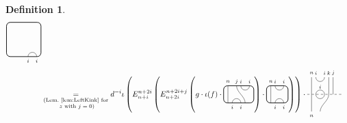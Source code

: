 \documentclass[11pt]{article}
\theoremstyle{plain}
\theoremstyle{definition}
\newtheorem{defn}[thm]{Definition}
\begin{document}
\begin{defn}
\begin{align*}
\begin{tikzpicture}[baseline=.3cm]
\begin{scope}[shift={(0,-.4)}]
    \draw (1,0) arc (180:0:.2cm);
    \node at (1,-.2) {\scriptsize{$i$}};
    \node at (1.4,-.2) {\scriptsize{$i$}};
   \end{scope}
   \draw[thick, rounded corners=5pt] (0,-.4) rectangle (1.6,1.2);
  \end{tikzpicture}
  \\& 
  \underset{
  \substack{
  \text{(Lem.~\ref{lem:LeftKink} for}
  \\
  \text{ 
  $z$ with $j=0$)}
  }
  }
  {=}
  d^{-i}
  \iota\left(E^{n+2i}_{n+i}\left(E^{n+2i+j}_{n+2i}\left(g\cdot\iota(f)\cdot
  \begin{tikzpicture}[baseline=.3cm]
   \draw (.2,0) -- (.2,.8);
   \node at (.2,1) {\scriptsize{$n$}};
   \draw (.6,.8) .. controls ++(-90:.3cm) and ++ (-270:.3cm) .. (1,0);
   \node at (.6,1) {\scriptsize{$j$}};
   \draw (.8,.8) arc (-180:0:.2cm);
   \node at (.8,1) {\scriptsize{$i$}};
   \node at (1.2,1) {\scriptsize{$i$}};
   \draw (.4,0) arc (180:0:.2cm);
   \node at (.4,-.2) {\scriptsize{$i$}};
   \node at (.8,-.2) {\scriptsize{$i$}};
   \draw[thick, rounded corners=5pt] (0,0) rectangle (1.4,.8);
  \end{tikzpicture}
  \right)\cdot
  \begin{tikzpicture}[baseline=.3cm]
   \draw (.2,0) -- (.2,.8);
   \node at (.2,1) {\scriptsize{$n$}};
   \draw (.4,0) arc (180:0:.2cm);
   \node at (.4,-.2) {\scriptsize{$i$}};
   \node at (.8,-.2) {\scriptsize{$i$}};
   \draw (.4,.8) arc (-180:0:.2cm);
   \node at (.4,1) {\scriptsize{$i$}};
   \node at (.8,1) {\scriptsize{$i$}};
   \draw[thick, rounded corners=5pt] (0,0) rectangle (1,.8);
  \end{tikzpicture}
  \right)\right)\cdot
  \begin{tikzpicture}[baseline=.3cm]
   \begin{scope}[shift={(0,.4)}]
    \draw (.2,0) -- (.2,.8);
    \node at (.2,1) {\scriptsize{$n$}};
    \draw (.4,0) arc (180:0:.2cm); %
    \draw (.4,.8) arc (-180:0:.2cm);
    \node at (.4,1) {\scriptsize{$i$}};
    \node at (.8,1) {\scriptsize{$i$}};
    \draw (1,0) -- (1,.8);
    \node at (1,1) {\scriptsize{$k$}};
    \draw (1.2,0) -- (1.2,.8);
    \node at (1.2,1) {\scriptsize{$j$}};
    \node at (.6,.35) {\scriptsize{$i$}};
    \draw[dashed] (0,0) -- (1.6,0);
   \end{scope}
   \begin{scope}[shift={(0,-.4)}]
    \draw (.2,0) -- (.2,.8);
    \node at (.2,-.2) {\scriptsize{$n$}};
    \draw (.4,.8) arc (-180:0:.2cm); %
    \draw (.6,0) .. controls ++(90:.3cm) and ++(270:.3cm) .. (1,.8);

\end{scope}
\end{tikzpicture}
\end{align*}
\end{defn}
\end{document}
